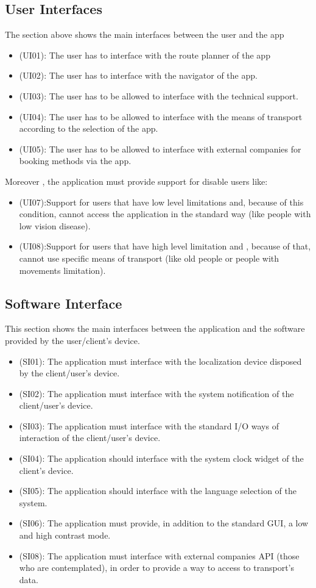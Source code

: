 \documentclass[a4paper,leqno]{book}
\begin{document}
\subsection{User Interfaces}
The section above shows the main interfaces between the user and the app 
\begin{itemize}
\item (UI01): The user has to interface with the route planner of the app
\item (UI02): The user has to interface with the navigator of the app.
\item (UI03): The user has to be allowed to interface with the technical support.
\item (UI04): The user has to be allowed to interface with the means of transport according to the selection of the app.
\item (UI05): The user has to be allowed to interface with external companies for booking methods via the app.
\end{itemize}

Moreover , the application must provide support for disable users like:
\begin{itemize}

\item (UI07):Support for users that have low level limitations and, because of this condition, cannot access the application in the standard way (like people with low vision disease). 
\item (UI08):Support for users that have high level limitation and , because of that, cannot use specific means of transport (like old people or people with movements limitation).

\end{itemize}

\subsection{Software Interface}
This section shows the main interfaces between the application and the software provided by the user/client's device.

\begin{itemize}
\item (SI01): The application must interface with the localization device disposed by the client/user's device.
\item (SI02): The application must interface with the system notification of the client/user's device.
\item (SI03): The application must interface with the standard I/O ways of interaction of the client/user's device.
\item (SI04): The application should interface with the system clock widget of the client's device.
\item (SI05): The application should interface with the language selection of the system.
\item (SI06): The application must provide, in addition to the standard GUI, a low and high contrast mode. 
\item (SI08): The application must interface with external companies API (those who are contemplated), in order to provide a way to access to transport's data.
\end{itemize}
\end{document}
